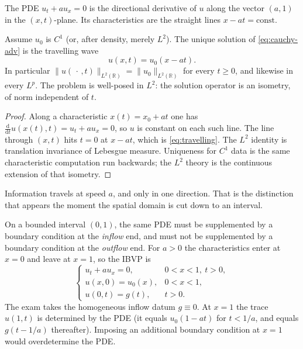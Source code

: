 The PDE \(u_t+a u_x=0\) is the directional derivative of \(u\) along the vector \((a,1)\) in the \((x,t)\)-plane. Its characteristics are the straight lines \(x-at=\mathrm{const}\).

\begin{proposition}
\label{prop:char}
Assume \(u_0\) is \(C^1\) (or, after density, merely \(L^2\)). The unique solution of \eqref{eq:cauchy-adv} is the travelling wave
\begin{equation}
\label{eq:travelling}
u(x,t)
=
u_0(x-at).
\end{equation}
In particular \(\|u(\,\cdot\,,t)\|_{L^2(\mathbb{R})}=\|u_0\|_{L^2(\mathbb{R})}\) for every \(t\ge 0\), and likewise in every \(L^p\). The problem is well-posed in \(L^2\): the solution operator is an isometry, of norm independent of \(t\).
\end{proposition}

\begin{proof}
Along a characteristic \(x(t)=x_0+at\) one has \(\frac{\mathrm{d}}{\mathrm{d}t}u(x(t),t)=u_t+a u_x=0\), so \(u\) is constant on each such line. The line through \((x,t)\) hits \(t=0\) at \(x-at\), which is \eqref{eq:travelling}. The \(L^2\) identity is translation invariance of Lebesgue measure. Uniqueness for \(C^1\) data is the same characteristic computation run backwards; the \(L^2\) theory is the continuous extension of that isometry.
\end{proof}

Information travels at speed \(a\), and only in one direction. That is the distinction that appears the moment the spatial domain is cut down to an interval.

\begin{definition}
\label{def:ibvp-adv}
On a bounded interval \((0,1)\), the same PDE must be supplemented by a boundary condition at the \emph{inflow} end, and must not be supplemented by a boundary condition at the \emph{outflow} end. For \(a>0\) the characteristics enter at \(x=0\) and leave at \(x=1\), so the IBVP is
\begin{equation}
\label{eq:ibvp-adv}
\begin{cases}
u_t + a u_x = 0, & 0<x<1,\ t>0, \\
u(x,0) = u_0(x), & 0<x<1, \\
u(0,t) = g(t), & t>0.
\end{cases}
\end{equation}
The exam takes the homogeneous inflow datum \(g\equiv 0\). At \(x=1\) the trace \(u(1,t)\) is determined by the PDE (it equals \(u_0(1-at)\) for \(t<1/a\), and equals \(g(t-1/a)\) thereafter). Imposing an additional boundary condition at \(x=1\) would overdetermine the PDE.
\end{definition}

